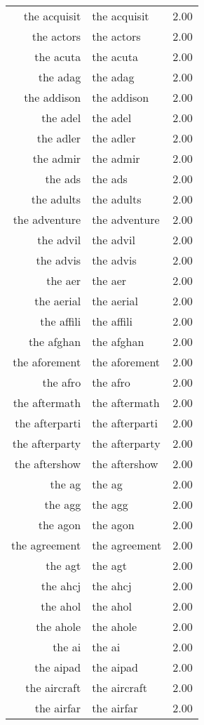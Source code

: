 \begin{table}[ht]
\begin{tabular}{rlr}
  the acquisit & the acquisit & 2.00 \\ 
  the actors & the actors & 2.00 \\ 
  the acuta & the acuta & 2.00 \\ 
  the adag & the adag & 2.00 \\ 
  the addison & the addison & 2.00 \\ 
  the adel & the adel & 2.00 \\ 
  the adler & the adler & 2.00 \\ 
  the admir & the admir & 2.00 \\ 
  the ads & the ads & 2.00 \\ 
  the adults & the adults & 2.00 \\ 
  the adventure & the adventure & 2.00 \\ 
  the advil & the advil & 2.00 \\ 
  the advis & the advis & 2.00 \\ 
  the aer & the aer & 2.00 \\ 
  the aerial & the aerial & 2.00 \\ 
  the affili & the affili & 2.00 \\ 
  the afghan & the afghan & 2.00 \\ 
  the aforement & the aforement & 2.00 \\ 
  the afro & the afro & 2.00 \\ 
  the aftermath & the aftermath & 2.00 \\ 
  the afterparti & the afterparti & 2.00 \\ 
  the afterparty & the afterparty & 2.00 \\ 
  the aftershow & the aftershow & 2.00 \\ 
  the ag & the ag & 2.00 \\ 
  the agg & the agg & 2.00 \\ 
  the agon & the agon & 2.00 \\ 
  the agreement & the agreement & 2.00 \\ 
  the agt & the agt & 2.00 \\ 
  the ahcj & the ahcj & 2.00 \\ 
  the ahol & the ahol & 2.00 \\ 
  the ahole & the ahole & 2.00 \\ 
  the ai & the ai & 2.00 \\ 
  the aipad & the aipad & 2.00 \\ 
  the aircraft & the aircraft & 2.00 \\ 
  the airfar & the airfar & 2.00 \\ 

\end{tabular}
\end{table}
